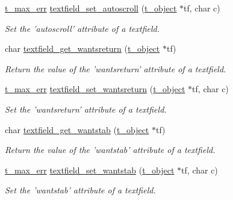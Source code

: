 \begin{DoxyCompactItemize}
\hyperlink{group__datatypes_ga73edaae82b318855cc09fac994918165}{t\_\-max\_\-err} \hyperlink{group__textfield_ga9e62ae7b82cb76dedac2a81cdc4e2a61}{textfield\_\-set\_\-autoscroll} (\hyperlink{structt__object}{t\_\-object} $\ast$tf, char c)
\begin{DoxyCompactList}\small\item\em Set the 'autoscroll' attribute of a textfield. \item\end{DoxyCompactList}\item 
char \hyperlink{group__textfield_ga3252a03aaa64615f51931d0413baf69a}{textfield\_\-get\_\-wantsreturn} (\hyperlink{structt__object}{t\_\-object} $\ast$tf)
\begin{DoxyCompactList}\small\item\em Return the value of the 'wantsreturn' attribute of a textfield. \item\end{DoxyCompactList}\item 
\hyperlink{group__datatypes_ga73edaae82b318855cc09fac994918165}{t\_\-max\_\-err} \hyperlink{group__textfield_ga58f4777a6d8b9a5282b16c70008ff477}{textfield\_\-set\_\-wantsreturn} (\hyperlink{structt__object}{t\_\-object} $\ast$tf, char c)
\begin{DoxyCompactList}\small\item\em Set the 'wantsreturn' attribute of a textfield. \item\end{DoxyCompactList}\item 
char \hyperlink{group__textfield_gaeb5fe0ef24f412513bed187ea80830c9}{textfield\_\-get\_\-wantstab} (\hyperlink{structt__object}{t\_\-object} $\ast$tf)
\begin{DoxyCompactList}\small\item\em Return the value of the 'wantstab' attribute of a textfield. \item\end{DoxyCompactList}\item 
\hyperlink{group__datatypes_ga73edaae82b318855cc09fac994918165}{t\_\-max\_\-err} \hyperlink{group__textfield_ga1c00dfa29cb591e2d97cdabd6a583cc3}{textfield\_\-set\_\-wantstab} (\hyperlink{structt__object}{t\_\-object} $\ast$tf, char c)
\begin{DoxyCompactList}\small\item\em Set the 'wantstab' attribute of a textfield. \item\end{DoxyCompactList}\item 

\end{DoxyCompactItemize}
